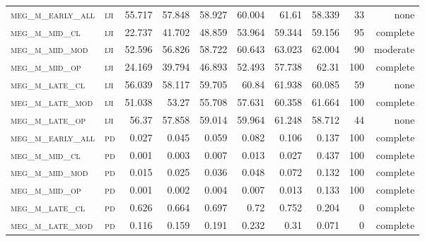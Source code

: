 \begin{landscape}
\begin{center}
\begin{footnotesize}
\begin{longtable}{llrrrrr|rrr}
\textsc{meg\_m\_early\_all} & \textsc{iji       }    & 55.717   & 57.848   & 58.927   & 60.004   & 61.61      & 58.339        & 33            & none             \\
\textsc{meg\_m\_mid\_cl   } & \textsc{iji       }    & 22.737   & 41.702   & 48.859   & 53.964   & 59.344     & 59.156        & 95            & complete              \\
\textsc{meg\_m\_mid\_mod  } & \textsc{iji       }    & 52.596   & 56.826   & 58.722   & 60.643   & 63.023     & 62.004        & 90            & moderate              \\
\textsc{meg\_m\_mid\_op   } & \textsc{iji       }    & 24.169   & 39.794   & 46.893   & 52.493   & 57.738     & 62.31         & 100           & complete             \\
\textsc{meg\_m\_late\_cl  } & \textsc{iji       }    & 56.039   & 58.117   & 59.705   & 60.84    & 61.938     & 60.085        & 59            & none              \\
\textsc{meg\_m\_late\_mod } & \textsc{iji       }    & 51.038   & 53.27    & 55.708   & 57.631   & 60.358     & 61.664        & 100           & complete             \\
\textsc{meg\_m\_late\_op  } & \textsc{iji       }    & 56.37    & 57.858   & 59.014   & 59.964   & 61.248     & 58.712        & 44            & none             \\
\textsc{meg\_m\_early\_all} & \textsc{pd        }    & 0.027    & 0.045    & 0.059    & 0.082    & 0.106      & 0.137         & 100           & complete             \\
\textsc{meg\_m\_mid\_cl   } & \textsc{pd        }    & 0.001    & 0.003    & 0.007    & 0.013    & 0.027      & 0.437         & 100           & complete             \\
\textsc{meg\_m\_mid\_mod  } & \textsc{pd        }    & 0.015    & 0.025    & 0.036    & 0.048    & 0.072      & 0.132         & 100           & complete             \\
\textsc{meg\_m\_mid\_op   } & \textsc{pd        }    & 0.001    & 0.002    & 0.004    & 0.007    & 0.013      & 0.133         & 100           & complete             \\
\textsc{meg\_m\_late\_cl  } & \textsc{pd        }    & 0.626    & 0.664    & 0.697    & 0.72     & 0.752      & 0.204         & 0             & complete            \\
\textsc{meg\_m\_late\_mod } & \textsc{pd        }    & 0.116    & 0.159    & 0.191    & 0.232    & 0.31       & 0.071         & 0             & complete            \\

\end{longtable}
\end{footnotesize}
\end{center}
\end{landscape}

